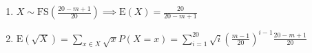 \begin{enumerate}[label=(\alph*)]
\item $X \sim \text{FS}(\frac{20-m+1}{20}) \implies \text{E}(X) = \frac{20}
{20-m+1}$

\item $\text{E}(\sqrt{X}) = \sum_{x \in X}\sqrt{x}P(X = x) = \sum_{i=1}^
{20}\sqrt{i}(\frac{m-1}{20})^{i-1}\frac{20-m+1}{20}$
\end{enumerate}